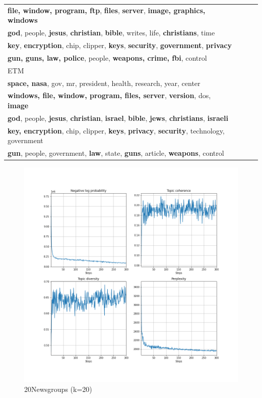 \begin{table}[ht]
\begin{tabular}{llll}
\textbf{file, window, program, ftp}, \textbf{files}, \textbf{server}, \textbf{image, graphics, windows}\\
\textbf{god}, people, \textbf{jesus}, \textbf{christian}, \textbf{bible}, writes, life, \textbf{christians}, time\\
\textbf{key}, \textbf{encryption}, chip, clipper, \textbf{keys}, \textbf{security}, \textbf{government}, \textbf{privacy}\\
\textbf{gun, guns, law, police}, people, \textbf{weapons, crime, fbi}, control
\\ \hline
\hline
ETM  \\ \hline
\textbf{space, nasa}, gov, mr, president, health, research, year, center\\
\textbf{windows, file, window, program, files, server}, \textbf{version}, dos, \textbf{image}\\
\textbf{god}, people, \textbf{jesus}, \textbf{christian}, \textbf{israel}, \textbf{bible}, \textbf{jews}, \textbf{christians}, \textbf{israeli}\\
\textbf{key, encryption}, chip, clipper, \textbf{keys}, \textbf{privacy}, \textbf{security}, technology, government\\
\textbf{gun}, people, government, \textbf{law}, state, \textbf{guns}, article, \textbf{weapons}, control
\\ \hline
\end{tabular}
\end{table}
\begin{figure}
\centering
\includegraphics[width=0.8\linewidth]{figures/0106/ppl_20t.png}
\caption{20Newsgroups (k=20)}
\label{fig:ppl20t}
\end{figure}
